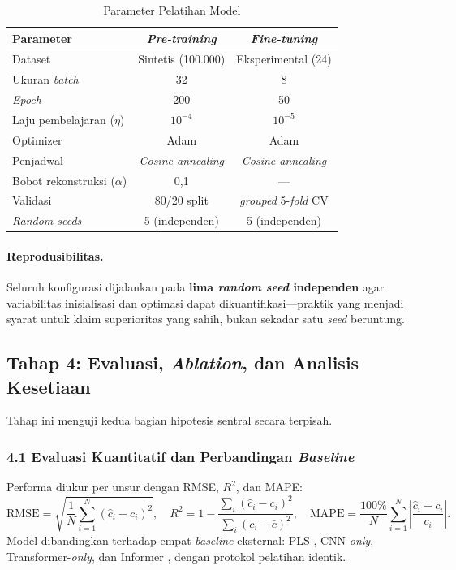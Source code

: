 \begin{table}[H]
  \centering
  \caption{Parameter Pelatihan Model}
  \label{tab:ai_param_pelatihan}
  \small
  \begin{tabular}{|l|c|c|}
    \hline
    \textbf{Parameter} & \textbf{\textit{Pre-training}} & \textbf{\textit{Fine-tuning}} \\ \hline
    Dataset & Sintetis (100.000) & Eksperimental (24) \\ \hline
    Ukuran \textit{batch} & 32 & 8 \\ \hline
    \textit{Epoch} & 200 & 50 \\ \hline
    Laju pembelajaran ($\eta$) & $10^{-4}$ & $10^{-5}$ \\ \hline
    Optimizer & Adam & Adam \\ \hline
    Penjadwal & \textit{Cosine annealing} & \textit{Cosine annealing} \\ \hline
    Bobot rekonstruksi ($\alpha$) & 0,1 & --- \\ \hline
    Validasi & 80/20 split & \textit{grouped} 5-\textit{fold} CV \\ \hline
    \textit{Random seeds} & 5 (independen) & 5 (independen) \\ \hline
  \end{tabular}
\end{table}

\paragraph{Reprodusibilitas.} Seluruh konfigurasi dijalankan pada \textbf{lima \textit{random seed} independen} agar variabilitas inisialisasi dan optimasi dapat dikuantifikasi---praktik yang menjadi syarat untuk klaim superioritas yang sahih, bukan sekadar satu \textit{seed} beruntung.

\subsection{Tahap 4: Evaluasi, \textit{Ablation}, dan Analisis Kesetiaan}
Tahap ini menguji kedua bagian hipotesis sentral secara terpisah.

\subsubsection{4.1 Evaluasi Kuantitatif dan Perbandingan \textit{Baseline}}
Performa diukur per unsur dengan RMSE, $R^2$, dan MAPE:
\begin{equation} \label{eq:bab3ai_rmse}
\mathrm{RMSE} = \sqrt{\frac{1}{N}\sum_{i=1}^{N}\left(\hat{c}_i - c_i\right)^2}, \quad
R^2 = 1 - \frac{\sum_i(\hat{c}_i - c_i)^2}{\sum_i(c_i - \bar{c})^2}, \quad
\mathrm{MAPE} = \frac{100\%}{N}\sum_{i=1}^{N}\left|\frac{\hat{c}_i - c_i}{c_i}\right| .
\end{equation}
Model dibandingkan terhadap empat \textit{baseline} eksternal: PLS \citep{wold_pls_2001}, CNN-\textit{only}, Transformer-\textit{only}, dan Informer \citep{zhou_informer_2021, walidain_informer-based_2026}, dengan protokol pelatihan identik.

